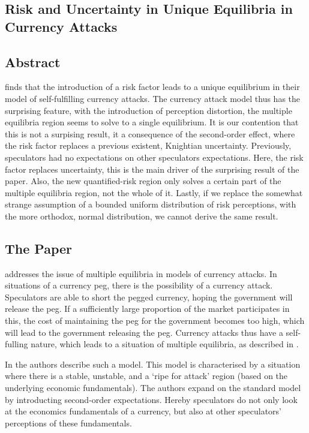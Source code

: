 \begin{refsection}
\chapter{Risk and Uncertainty in Unique Equilibria in Currency Attacks}
\label{unc}

\section*{Abstract}
\textcite{morris1998unique} finds that the introduction of a risk factor leads to a unique equilibrium in their model of self-fulfilling currency attacks. The currency attack model thus has the surprising feature, with the introduction of perception distortion, the multiple equilibria region seems to solve to a single equilibrium. It is our contention that this is not a surpising result, it a consequence of the second-order effect, where the risk factor replaces a previous existent, Knightian uncertainty. Previously, speculators had no expectations on other speculators expectations. Here, the risk factor replaces uncertainty, this is the main driver of the surprising result of the paper. Also, the new quantified-risk region only solves a certain part of the multiple equilibria region, not the whole of it. Lastly, if we replace the somewhat strange assumption of a bounded uniform distribution of risk perceptions, with the more orthodox, normal distribution, we cannot derive the same result.

\section{The Paper}
\label{unc:idea}
\textcite{morris1998unique} addresses the issue of multiple equilibria in models of currency attacks.
In situations of a currency peg, there is the possibility of a currency attack.
Speculators are able to short the pegged currency, hoping the government will release the peg.
If a sufficiently large proportion of the market participates in this,
the cost of maintaining the peg for the government becomes too high,
which will lead to the government releasing the peg.
Currency attacks thus have a self-fulling nature,
which leads to a situation of multiple equilibria,
as described in \textcite{obstfeld1986rational,obstfeld1995logic,obstfeld1996models}.

In \textcite{morris1998unique} the authors describe such a model.
This model is characterised by a situation where there is a stable, unstable,
and a `ripe for attack' region (based on the underlying economic fundamentals).
The authors expand on the standard model by introducting second-order expectations.
Hereby speculators do not only look at the economics fundamentals of a currency,
but also at other speculators' perceptions of these fundamentals.


\end{refsection}
